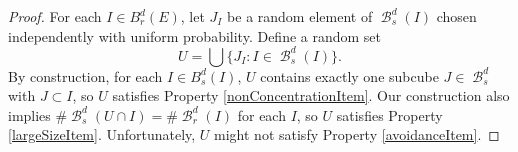\documentclass[dvipsnames,letterpaper,12pt]{article}
\numberwithin{equation}{section}
\theoremstyle{plain}
\DeclareMathOperator{\B}{\mathcal{B}}
\begin{document}
\begin{proof}
	For each $I \in B_r^d(E)$, let $J_I$ be a random element of $\B^d_s(I)$ chosen independently with uniform probability. Define a random set
	\begin{equation} \label{Udefinition}
		U = \bigcup \{ J_I : I \in \B^d_s(I) \}.
	\end{equation}
	By construction, for each $I \in B^d_s(I)$, $U$ contains exactly one subcube $J \in \B_s^d$ with $J \subset I$, so $U$ satisfies Property \ref{nonConcentrationItem}. Our construction also implies $\# \B_s^d(U \cap I) = \# \B_r^d(I)$ for each $I$, 
	so $U$ satisfies Property \ref{largeSizeItem}. Unfortunately, $U$ might not satisfy Property \ref{avoidanceItem}. %


\end{proof}
\end{document}
